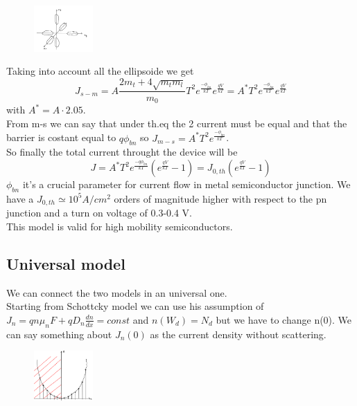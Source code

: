 \begin{figure}
\includegraphics[width=0.2\textwidth]{ellips.png}
\end{figure}

Taking into account all the ellipsoide we get
\begin{equation}
J_{s-m}=A \frac{2m_t+4\sqrt{m_tm_l}}{m_0}T^2e^{\frac{-\phi_{bn}}{kT}}e^{\frac{qV}{kT}}=A^*T^2e^{\frac{-\phi_{bn}}{kT}}e^{\frac{qV}{kT}}
\end{equation}
with $A^*=A\cdot2.05$.\\
From m-s we can say that under th.eq the 2 current must be equal and that the barrier is costant equal to $q\phi_{bn}$ so $J_{m-s}=A^*T^2e^{\frac{-\phi_{bn}}{kT}}$.\\
So finally the total current throught the device will be 
\begin{equation}
J=A^*T^2e^{\frac{-q\phi_{bn}}{kT}}(e^{\frac{qV}{kT}}-1)=J_{0,th}(e^{\frac{qV}{kT}}-1)
\end{equation}
$\phi_{bn}$ it's a crucial parameter for current flow in metal semiconductor junction. We have a $J_{0,th}\simeq10^5 A/cm^2$ orders of magnitude higher with respect to the pn junction and a turn on voltage of 0.3-0.4 V.\\
This model is valid for high mobility semiconductors.\\
\subsection{Universal model}
We can connect the two models in an universal one.\\
Starting from Schottcky model we can use his assumption of $ J_n=qn\mu_nF+qD_n \frac{dn}{dx}=const$ and $n(W_d)=N_d$ but we have to change n(0). We can say something about $J_n(0)$ as the current density without scattering.

\begin{figure}
\includegraphics[width=0.2\textwidth]{generalmsmodel.png}
\end{figure}
 
